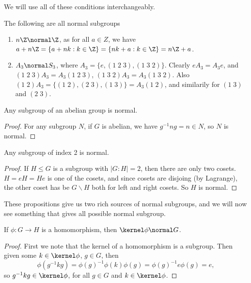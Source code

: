 \documentclass[a4]{scrreprt}
\begin{document}
We will use all of these conditions interchangeably.

\begin{example}
	The following are all normal subgroups
	\begin{enumerate}[label=(\roman*)]
		\item $n\Z \normal \Z$, as for all $a \in Z$, we have
		$a + n\Z = \{a + nk : k \in \Z\} = \{nk + a : k \in \Z\} = n\Z + a$.
		\item 
		$A_3 \normal S_3$, where $A_3 = \{e, (1\; 2\; 3), (1\; 3\; 2)\}$. Clearly $eA_3 = A_3 e$, and $(1\;2\;3)A_3 = A_3 (1\; 2\; 3)$, $(1\; 3\; 2)A_3 = A_3 (1\; 3\; 2)$. Also $(1\; 2)A_3 = \{(1\; 2), (2\; 3), (1\; 3)\} = A_3(1\; 2)$, and similarily for $(1\;3)$ and $(2\; 3)$.
	\end{enumerate}
\end{example}

\begin{proposition}
	Any subgroup of an abelian group is normal.
\end{proposition}
\begin{proof}
	For any subgroup $N$,
	if $G$ is abelian, we have $g^{-1}n g = n \in N$, so $N$ is normal.
\end{proof}

\begin{proposition}
	Any subgroup of index 2 is normal.
\end{proposition}
\begin{proof}
	If $H \leq G$ is a subgroup with $|G:H| = 2$, then there are only two cosets. $H = eH = He$ is one of the cosets, and since cosets are disjoing (by Lagrange), the other coset has be $G\backslash H$ both for left and right cosets. So $H$ is normal.
\end{proof}

These propositions give us two rich sources of normal subgroups, and we will now see something that gives all possible normal subgroup.

\begin{proposition}
	If $\phi : G \rightarrow H$ is a homomorphism, then $\kernel \phi \normal G$.
\end{proposition}
\begin{proof}
	First we note that the kernel of a homomorphism is a subgroup. Then given some $k \in \kernel \phi$, $g \in G$, then
	$$
	\phi(g^{-1} k g) = \phi(g)^{-1} \phi(k) \phi(g) = \phi(g)^{-1} e \phi(g) = e,
	$$
	so $g^{-1} k g \in \kernel \phi$, for all $g \in G$ and $k \in \kernel \phi$.
\end{proof}
\end{document}
